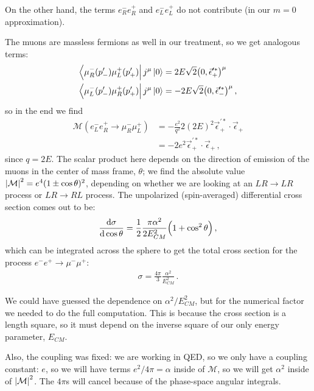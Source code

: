 \documentclass[main.tex]{subfiles}
\begin{document}
On the other hand, the terms \(e_{R}^{-} e_{R}^{+}\) and \(e_{L}^{-} e_{L}^{+}\) do not contribute (in our \(m = 0\) approximation).

The muons are massless fermions as well in our treatment, so we get analogous terms: 
%
\begin{align}
\bra{\mu^-_R (p'_-) \mu^+_L (p'_+)} j^{\mu } \ket{0} &= 2E \sqrt{2} \qty(0, \vec{\epsilon}^{\prime *}_+)^{\mu } \\
\bra{\mu^-_L (p'_-) \mu^+_R (p'_+)} j^{\mu } \ket{0} &= - 2E \sqrt{2} \qty(0, \vec{\epsilon}^{\prime *}_-)^{\mu }
\,,
\end{align}
%
so in the end we find 
%
\begin{align}
\mathcal{M} (e^{-}_{L} e^{+}_{R} \to \mu^-_R \mu^+_L) 
&= - \frac{e^2}{q^2} 2 (2E)^2 
\vec{\epsilon}^{\prime *}_{+} \cdot \vec{\epsilon}_{+}  \\
&= - 2 e^2 \vec{\epsilon}^{\prime *}_{+} \cdot \vec{\epsilon}_{+}
\,,
\end{align}
%
since \(q  =2 E\). 
The scalar product here depends on the direction of emission of the muons in the center of mass frame, \(\theta \); we find the absolute value \(\abs{\mathcal{M}}^2 = e^{4} (1 \pm \cos \theta )^2\), depending on whether we are looking at an \(LR \to LR\) process or \(LR \to RL\) process. The unpolarized (spin-averaged) differential cross section comes out to be: 
%
\begin{align}
\dv{\sigma }{\cos \theta } = \frac{1}{2} \frac{\pi \alpha^2}{2 E_{CM}^2} \qty(1 + \cos^2\theta )
\,,
\end{align}
%
which can be integrated across the sphere to get the total cross section for the process \(e^{-} e^{+} \to \mu^- \mu^+\): 
%
\begin{align}
\sigma = \frac{4 \pi }{3} \frac{\alpha^2}{E^2_{CM}}
\,.
\end{align}

We could have guessed the dependence on \(\alpha^2  / E^2_{CM}\), but for the numerical factor we needed to do the full computation. 
This is because the cross section is a length square, so it must depend on the inverse square of our only energy parameter, \(E_{CM}\). 

Also, the coupling was fixed: we are working in QED, so we only have a coupling constant: \(e\), so we will have terms \(e^2 / 4 \pi = \alpha \) inside of \(\mathcal{M}\), so we will get \(\alpha^2\) inside of \(\abs{\mathcal{M}}^2\). 
The \(4 \pi \)s will cancel because of the phase-space angular integrals.
\end{document}
